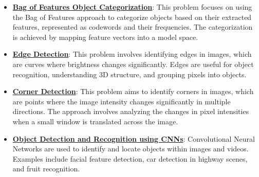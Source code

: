 \documentclass{article}%
\begin{document}
\begin{itemize}[leftmargin=*]
\item \href{https://purdue.brightspace.com/d2l/common/assets/pdfjs-d2l-dist/1.0.14-legacy/web/viewer.html?file=\%2Fcontent\%2Fenforced\%2F1095467-wl.202510.CS.24300.001\%2F08L2-Feature Extraction.pdf\%3Fou\%3D1095467\&lang=en-us\&container=d2l-fileviewer-rendered-pdf\&fullscreen=d2l-fileviewer-rendered-pdf-dialog\&height=667#page=3}{\textbf{Bag of Features Object Categorization}}: This problem focuses on using the Bag of Features approach to categorize objects based on their extracted features, represented as codewords and their frequencies. The categorization is achieved by mapping feature vectors into a model space.%
\item \href{https://purdue.brightspace.com/d2l/common/assets/pdfjs-d2l-dist/1.0.14-legacy/web/viewer.html?file=\%2Fcontent\%2Fenforced\%2F1095467-wl.202510.CS.24300.001\%2F08L2-Feature Extraction.pdf\%3Fou\%3D1095467\&lang=en-us\&container=d2l-fileviewer-rendered-pdf\&fullscreen=d2l-fileviewer-rendered-pdf-dialog\&height=667#page=4}{\textbf{Edge Detection}}: This problem involves identifying edges in images, which are curves where brightness changes significantly. Edges are useful for object recognition, understanding 3D structure, and grouping pixels into objects.%
\item \href{https://purdue.brightspace.com/d2l/common/assets/pdfjs-d2l-dist/1.0.14-legacy/web/viewer.html?file=\%2Fcontent\%2Fenforced\%2F1095467-wl.202510.CS.24300.001\%2F08L2-Feature Extraction.pdf\%3Fou\%3D1095467\&lang=en-us\&container=d2l-fileviewer-rendered-pdf\&fullscreen=d2l-fileviewer-rendered-pdf-dialog\&height=667#page=20}{\textbf{Corner Detection}}: This problem aims to identify corners in images, which are points where the image intensity changes significantly in multiple directions. The approach involves analyzing the changes in pixel intensities when a small window is translated across the image.%
\item \href{https://purdue.brightspace.com/d2l/common/assets/pdfjs-d2l-dist/1.0.14-legacy/web/viewer.html?file=\%2Fcontent\%2Fenforced\%2F1095467-wl.202510.CS.24300.001\%2F09L1-cnn.pdf\%3Fou\%3D1095467\&lang=en-us\&container=d2l-fileviewer-rendered-pdf\&fullscreen=d2l-fileviewer-rendered-pdf-dialog\&height=667#page=2}{\textbf{Object Detection and Recognition using CNNs}}: Convolutional Neural Networks are used to identify and locate objects within images and videos. Examples include facial feature detection, car detection in highway scenes, and fruit recognition.%
\end{itemize}
\end{document}
